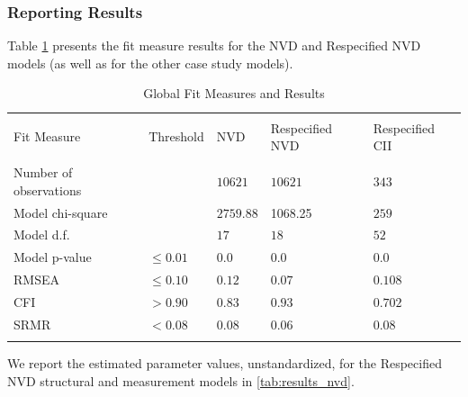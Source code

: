 \subsubsection{Reporting Results}
\label{sec:case_nvd_results}

Table \ref{tab:results_fit_all} presents the fit measure results for the NVD  and Respecified NVD models (as well as for the other case study models).

\begin{table}
	\begin{center}	
		\caption{Global Fit Measures and Results}
			\label{tab:results_fit_all}
			\begin{tabular}{p{3cm}p{1cm}|p{2cm}p{2cm}p{2cm}}
				\\[-1.8ex]\hline 
				\hline \\[-1.8ex] 
				Fit Measure & Threshold & NVD	& Respecified NVD & Respecified CII  \\
				\hline \\[-1.8ex] 				
				Number of observations &  & $10621$  & $10621$ & $343$  \\				
				Model chi-square &  & $2759.88$ & 1068.25 & $259$  \\				
				Model d.f. &  & $17$ & $18$ & $52$  \\		
				Model p-value & $\leq 0.01$ & $0.0$ & $0.0$ & $0.0$  \\
				RMSEA & $\leq 0.10$ &  $0.12$ &  $0.07$ & $0.108$   \\
				CFI & $> 0.90$ & $0.83$ & $0.93$  & $0.702$  \\
				SRMR & $< 0.08$ & $0.08$ & $0.06$ & $0.08$  \\
				\hline \\[-1.8ex] 				
			\end{tabular}
	\end{center}
\end{table}

We report the estimated parameter values, unstandardized, for the Respecified NVD structural and measurement models in \ref{tab:results_nvd}.


